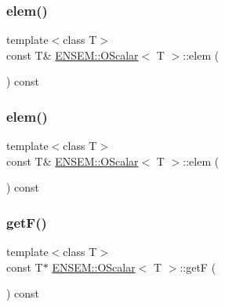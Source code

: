 \mbox{\label{classENSEM_1_1OScalar_af797ae7d3763acab7b024aa159b3a7b8}} 
\subsubsection{\texorpdfstring{elem()}{elem()}\hspace{0.1cm}{\footnotesize\ttfamily [3/4]}}
{\footnotesize\ttfamily template$<$class T$>$ \\
const T\& \mbox{\hyperlink{classENSEM_1_1OScalar}{E\+N\+S\+E\+M\+::\+O\+Scalar}}$<$ T $>$\+::elem (\begin{DoxyParamCaption}{ }\end{DoxyParamCaption}) const\hspace{0.3cm}{\ttfamily [inline]}}

\mbox{\label{classENSEM_1_1OScalar_af797ae7d3763acab7b024aa159b3a7b8}} 
\subsubsection{\texorpdfstring{elem()}{elem()}\hspace{0.1cm}{\footnotesize\ttfamily [4/4]}}
{\footnotesize\ttfamily template$<$class T$>$ \\
const T\& \mbox{\hyperlink{classENSEM_1_1OScalar}{E\+N\+S\+E\+M\+::\+O\+Scalar}}$<$ T $>$\+::elem (\begin{DoxyParamCaption}{ }\end{DoxyParamCaption}) const\hspace{0.3cm}{\ttfamily [inline]}}

\mbox{\label{classENSEM_1_1OScalar_a8e87e97e45239d934b0d141dcf9b92d7}} 
\subsubsection{\texorpdfstring{getF()}{getF()}\hspace{0.1cm}{\footnotesize\ttfamily [1/4]}}
{\footnotesize\ttfamily template$<$class T$>$ \\
const T$\ast$ \mbox{\hyperlink{classENSEM_1_1OScalar}{E\+N\+S\+E\+M\+::\+O\+Scalar}}$<$ T $>$\+::getF (\begin{DoxyParamCaption}{ }\end{DoxyParamCaption}) const\hspace{0.3cm}{\ttfamily [inline]}}



